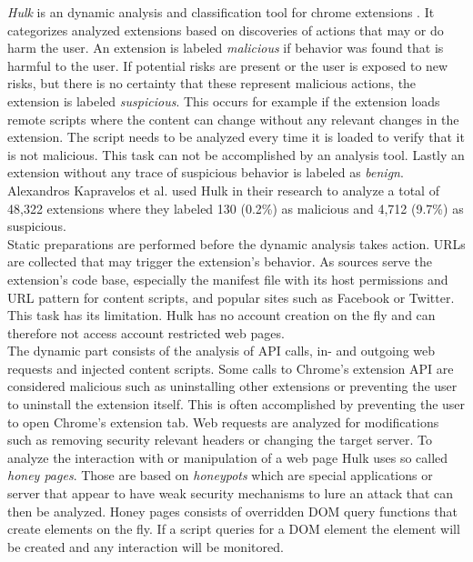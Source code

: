 \documentclass[article,colorback,accentcolor=tud9c,type=bsc]{tudthesis}
\begin{document}
	\textit{Hulk} is an dynamic analysis and classification tool for chrome extensions \cite{184485}. It categorizes analyzed extensions based on discoveries of actions that may or do harm the user. An extension is labeled \textit{malicious} if behavior was found that is harmful to the user. If potential risks are present or the user is exposed to new risks, but there is no certainty that these represent malicious actions, the extension is labeled \textit{suspicious}. This occurs for example if the extension loads remote scripts where the content can change without any relevant changes in the extension. The script needs to be analyzed every time it is loaded to verify that it is not malicious. This task can not be accomplished by an analysis tool. Lastly an extension without any trace of suspicious behavior is labeled as \textit{benign}. Alexandros Kapravelos et al. used Hulk in their research to analyze a total of 48,322 extensions where they labeled 130 (0.2\%) as malicious and 4,712 (9.7\%) as suspicious. \\
	Static preparations are performed before the dynamic analysis takes action. URLs are collected that may trigger the extension's behavior. As sources serve the extension's code base, especially the manifest file with its host permissions and URL pattern for content scripts, and popular sites such as Facebook or Twitter. This task has its limitation. Hulk has no account creation on the fly and can therefore not access account restricted web pages. \\
	The dynamic part consists of the analysis of API calls, in- and outgoing web requests and injected content scripts. Some calls to Chrome's extension API are considered malicious such as uninstalling other extensions or preventing the user to uninstall the extension itself. This is often accomplished by preventing the user to open Chrome's extension tab. Web requests are analyzed for modifications such as removing security relevant headers or changing the target server. To analyze the interaction with or manipulation of a web page Hulk uses so called \textit{honey pages}. Those are based on \textit{honeypots} which are special applications or server that appear to have weak security mechanisms to lure an attack that can then be analyzed. Honey pages consists of overridden DOM query functions that create elements on the fly. If a script queries for a DOM element the element will be created and any interaction will be monitored. \\
	
\end{document}
